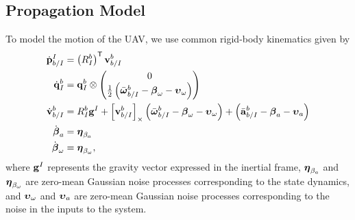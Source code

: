 
\subsection{Propagation Model}
To model the motion of the UAV, we use common rigid-body kinematics given by
\begin{align}
  \dot{\boldsymbol{\mathrm{p}}}_{b/I}^I
  &=
  \left( R_I^b \right)^{\mathsf{T}} \boldsymbol{\mathrm{v}}_{b/I}^b
  \label{eq:uav_dynamics}
  \\
  \dot{\boldsymbol{\mathrm{q}}}_{I}^{b} 
	&= 	
  \boldsymbol{\mathrm{q}}_I^b \otimes \begin{pmatrix} 0 \\ \frac{1}{2}
    \left( \bar{\boldsymbol{\mathrm{\omega}}}_{b/I}^b - \boldsymbol{\mathrm{\beta}}_\omega - \boldsymbol{\mathrm{\upsilon}}_\omega \right)
\end{pmatrix} \nonumber \\
  \dot{\boldsymbol{\mathrm{v}}}_{b/I}^b 
  &=
  R_I^b \boldsymbol{\mathrm{g}}^I
  +
  \left[ \boldsymbol{\mathrm{v}}_{b/I}^b \right]_{\times}
  \left( \bar{\boldsymbol{\mathrm{\omega}}}_{b/I}^b - \boldsymbol{\mathrm{\beta}}_\omega -
  \boldsymbol{\mathrm{\upsilon}}_\omega \right)
  +
  \left( \bar{\boldsymbol{\mathrm{a}}}_{b/I}^b - \boldsymbol{\mathrm{\beta}}_a - \boldsymbol{\mathrm{\upsilon}}_a \right) \nonumber
  \\
  \dot{\boldsymbol{\mathrm{\beta}}}_a &= \boldsymbol{\mathrm{\eta}}_{\beta_a} \nonumber
  \\
  \dot{\boldsymbol{\mathrm{\beta}}}_\omega &= \boldsymbol{\mathrm{\eta}}_{\beta_\omega}, \nonumber
\end{align}
where $\boldsymbol{\mathrm{g}}^I$ represents the gravity vector expressed in the inertial
frame, $\boldsymbol{\mathrm{\eta}}_{\beta_a}$ and $\boldsymbol{\mathrm{\eta}}_{\beta_\omega}$ are zero-mean
Gaussian noise processes corresponding to the state dynamics, and
$\boldsymbol{\mathrm{\upsilon}}_\omega$ and $\boldsymbol{\mathrm{\upsilon}}_a$ are zero-mean Gaussian noise
processes corresponding to the noise in the inputs to the system.

